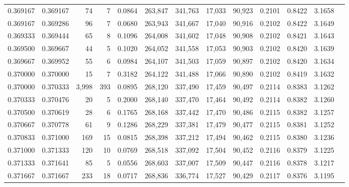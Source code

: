 \begin{tabular}{rrrrrrrrrrrrr}
0.369167 & 0.369167 &    74 &   7 &                                     0.0864 & 263,847 & 341,763 &  17,033 &  90,923 & 0.2101 & 0.8422 & 3.1658 \\
0.369167 & 0.369286 &    96 &   7 &                                     0.0680 & 263,943 & 341,667 &  17,040 &  90,916 & 0.2102 & 0.8422 & 3.1649 \\
0.369333 & 0.369444 &    65 &   8 &                                     0.1096 & 264,008 & 341,602 &  17,048 &  90,908 & 0.2102 & 0.8421 & 3.1643 \\
0.369500 & 0.369667 &    44 &   5 &                                     0.1020 & 264,052 & 341,558 &  17,053 &  90,903 & 0.2102 & 0.8420 & 3.1639 \\
0.369667 & 0.369952 &    55 &   6 &                                     0.0984 & 264,107 & 341,503 &  17,059 &  90,897 & 0.2102 & 0.8420 & 3.1634 \\
0.370000 & 0.370000 &    15 &   7 &                                     0.3182 & 264,122 & 341,488 &  17,066 &  90,890 & 0.2102 & 0.8419 & 3.1632 \\
0.370000 & 0.370333 & 3,998 & 393 &                                     0.0895 & 268,120 & 337,490 &  17,459 &  90,497 & 0.2114 & 0.8383 & 3.1262 \\
0.370333 & 0.370476 &    20 &   5 &                                     0.2000 & 268,140 & 337,470 &  17,464 &  90,492 & 0.2114 & 0.8382 & 3.1260 \\
0.370500 & 0.370619 &    28 &   6 &                                     0.1765 & 268,168 & 337,442 &  17,470 &  90,486 & 0.2115 & 0.8382 & 3.1257 \\
0.370667 & 0.370778 &    61 &   9 &                                     0.1286 & 268,229 & 337,381 &  17,479 &  90,477 & 0.2115 & 0.8381 & 3.1252 \\
0.370833 & 0.371000 &   169 &  15 &                                     0.0815 & 268,398 & 337,212 &  17,494 &  90,462 & 0.2115 & 0.8380 & 3.1236 \\
0.371000 & 0.371333 &   120 &  10 &                                     0.0769 & 268,518 & 337,092 &  17,504 &  90,452 & 0.2116 & 0.8379 & 3.1225 \\
0.371333 & 0.371641 &    85 &   5 &                                     0.0556 & 268,603 & 337,007 &  17,509 &  90,447 & 0.2116 & 0.8378 & 3.1217 \\
0.371667 & 0.371667 &   233 &  18 &                                     0.0717 & 268,836 & 336,774 &  17,527 &  90,429 & 0.2117 & 0.8376 & 3.1195 \\

\end{tabular}
